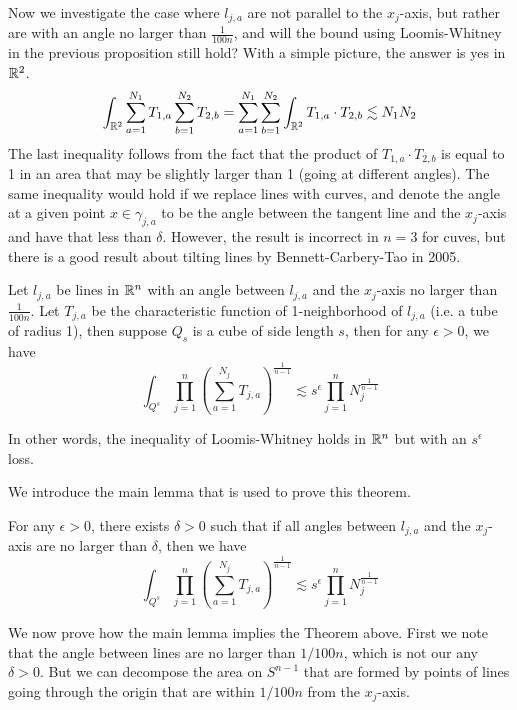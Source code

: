 Now we investigate the case where $l_{j,a}$ are not parallel to the $x_j$-axis, but rather are with an angle no larger than $\frac{1}{100n}$, and will the bound using Loomis-Whitney in the previous proposition still hold? With a simple picture, the answer is yes in $\mathbb{R}^2$.
\begin{equation*}
    \int_{\mathbb{R}^2}\sum_{a=1}^{N_1}T_{1,a}\sum_{b=1}^{N_2}T_{2,b}=\sum_{a=1}^{N_1}\sum_{b=1}^{N_2}\int_{\mathbb{R}^2}T_{1,a}\cdot T_{2,b}\lesssim N_1N_2
\end{equation*}
The last inequality follows from the fact that the product of $T_{1,a}\cdot T_{2,b}$ is equal to 1 in an area that may be slightly larger than 1 (going at different angles). The same inequality would hold if we replace lines with curves, and denote the angle at a given point $x\in\gamma_{j,a}$ to be the angle between the tangent line and the $x_j$-axis and have that less than $\delta$. However, the result is incorrect in $n=3$ for cuves, but there is a good result about tilting lines by Bennett-Carbery-Tao in 2005.

\begin{theorem}
    Let $l_{j,a}$ be lines in $\mathbb{R}^n$ with an angle between $l_{j,a}$ and the $x_j$-axis no larger than $\frac{1}{100n}$. Let $T_{j,a}$ be the characteristic function of 1-neighborhood of $l_{j,a}$ (i.e. a tube of radius 1), then suppose $Q_s$ is a cube of side length $s$, then for any $\epsilon>0$, we have
    \begin{equation*}
        \int_{Q^s}\prod_{j=1}^n\left(\sum_{a=1}^{N_j}T_{j,a}\right)^{\frac{1}{n-1}}\lesssim s^\epsilon\prod_{j=1}^nN_j^{\frac{1}{n-1}}
    \end{equation*}
\end{theorem}
In other words, the inequality of Loomis-Whitney holds in $\mathbb{R}^n$ but with an $s^\epsilon$ loss.

We introduce the main lemma that is used to prove this theorem.
\begin{lemma}
    For any $\epsilon>0$, there exists $\delta>0$ such that if all angles between $l_{j,a}$ and the $x_j$-axis are no larger than $\delta$, then we have
    \begin{equation*}
        \int_{Q^s}\prod_{j=1}^n\left(\sum_{a=1}^{N_j}T_{j,a}\right)^{\frac{1}{n-1}}\lesssim s^\epsilon\prod_{j=1}^nN_j^{\frac{1}{n-1}}
    \end{equation*}
\end{lemma}
We now prove how the main lemma implies the Theorem above. First we note that the angle between lines are no larger than $1/100n$, which is not our any $\delta>0$. But we can decompose the area on $S^{n-1}$ that are formed by points of lines going through the origin that are within $1/100n$ from the $x_j$-axis.

